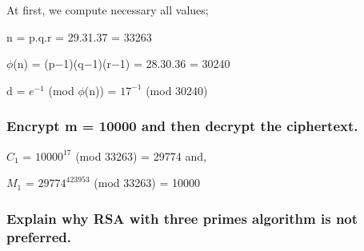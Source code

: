 \documentclass[11pt]{article}
\begin{document}
At first, we compute necessary all values;\\

\begin{center}
n = p.q.r = 29.31.37 = 33263\\
\end{center}
    
\begin{center}
$\phi $(n) = (p−1)(q−1)(r−1) = 28.30.36 = 30240\\
\end{center}
\begin{center}
    d = $e^{-1}$ (mod $\phi$(n)) = $17^{-1}$ (mod 30240)\\

\end{center}


\subsubsection{\textbf{Encrypt m = 10000 and then decrypt the ciphertext.}}


\begin{center}
    $C_{1}$ = $10000^{17}$ (mod 33263) = 29774 and,
\end{center}

\begin{center}
    $M_{1}$ = $29774^{423953}$ (mod 33263) = 10000
 
\end{center}


\subsubsection{\textbf{Explain why RSA with three primes algorithm is not preferred.}}
\end{document}

